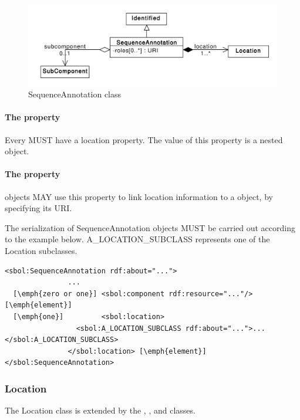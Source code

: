 \begin{figure}[ht]
\begin{center}
\includegraphics[scale=0.6]{uml/sequence_annotation}
\caption[]{SequenceAnnotation class}
\label{uml:sequence_annotation}
\end{center}
\end{figure}

\paragraph{The  property}
Every  MUST have a location property. The value of this property is a nested  object.

\paragraph{The  property}
 objects MAY use this property to link location information to a  object, by specifying its URI.


The serialization of SequenceAnnotation objects MUST be carried out according to the example below. A\_LOCATION\_SUBCLASS represents one of the Location subclasses.
\begin{lstlisting}
<sbol:SequenceAnnotation rdf:about="...">
               ...   
  [\emph{zero or one}] <sbol:component rdf:resource="..."/> [\emph{element}] 
  [\emph{one}]         <sbol:location>
                 <sbol:A_LOCATION_SUBCLASS rdf:about="...">...</sbol:A_LOCATION_SUBCLASS>
               </sbol:location> [\emph{element}] 
</sbol:SequenceAnnotation>
\end{lstlisting}




\subsubsection{Location}
\label{sec:Location}
The Location class is extended by the , , and  classes.


